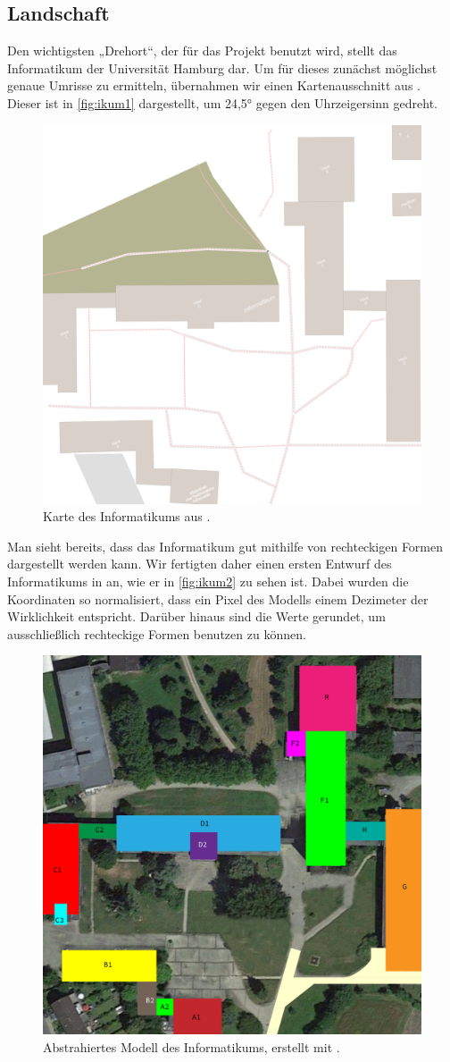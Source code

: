 \subsection{Landschaft}

Den wichtigsten „Drehort“, der für das Projekt benutzt wird, stellt das Informatikum der Universität Hamburg dar. Um für dieses zunächst möglichst genaue Umrisse zu ermitteln, übernahmen wir einen Kartenausschnitt aus \OSM. Dieser ist in \autoref{fig:ikum1} dargestellt, um 24,5° gegen den Uhrzeigersinn gedreht.

\begin{figure}[h]
	\centering
	\includegraphics[width=0.55\linewidth]{Informatikum/Informatikum1}
	\caption{Karte des Informatikums aus \OSM.}
	\label{fig:ikum1}
\end{figure}

Man sieht bereits, dass das Informatikum gut mithilfe von rechteckigen Formen dargestellt werden kann. Wir fertigten daher einen ersten Entwurf des Informatikums in \Illustrator an, wie er in \autoref{fig:ikum2} zu sehen ist. Dabei wurden die Koordinaten so normalisiert, dass ein Pixel des Modells einem Dezimeter der Wirklichkeit entspricht. Darüber hinaus sind die Werte gerundet, um ausschließlich rechteckige Formen benutzen zu können.

\begin{figure}[h]
	\centering
	\includegraphics[width=0.55\linewidth]{Informatikum/Informatikum2}
	\caption{Abstrahiertes Modell des Informatikums, erstellt mit \Illustrator.}
	\label{fig:ikum2}
\end{figure}

